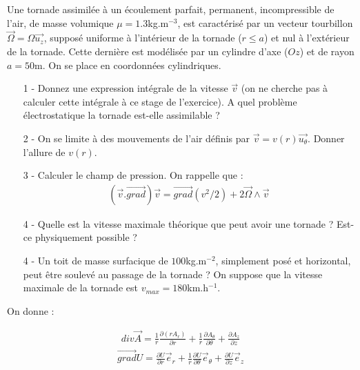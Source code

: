 \documentclass{report}
\begin{document}
Une tornade assimilée à un écoulement parfait, permanent, incompressible de l'air, de masse volumique $\mu = 1.3$kg.m$^{-3}$, est caractérisé par un vecteur tourbillon $\vec{\Omega} = \Omega \vec{u_{z}}$, supposé uniforme à l'intérieur de la tornade ($r\leq a$) et nul à l'extérieur de la tornade. Cette dernière est modélisée par un cylindre d'axe ($Oz$) et de rayon $a=50$m. On se place en coordonnées cylindriques.

\begin{itemize}

	\item[1 - ] Donnez une expression intégrale de la vitesse $\vec{v}$ (on ne cherche pas à calculer cette intégrale à ce stage de l'exercice). A quel problème électrostatique la tornade est-elle assimilable ?
	\item[2 - ] On se limite à des mouvements de l'air définis par $\vec{v} = v(r)\vec{u_{\theta}}$. Donner l'allure de $v(r)$.
	\item[3 - ] Calculer le champ de pression. On rappelle que : 
	\begin{align*}
		(\vec{v}.\vec{grad})\vec{v} =\vec{grad}(v^{2}/2) + 2\vec{\Omega}\wedge \vec{v}
	\end{align*}
	\item[4 - ] Quelle est la vitesse maximale théorique que peut avoir une tornade ? Est-ce physiquement possible ?
	\item[4 - ] Un toit de masse surfacique de $100$kg.m$^{-2}$, simplement posé et horizontal, peut être soulevé au passage de la tornade ? On suppose que la vitesse maximale de la tornade est $v_{max} = 180$km.h$^{-1}$.
\end{itemize}

On donne :

\begin{align*}
	div\vec{A} = \frac{1}{r}\frac{\partial(rA_{r})}{\partial r} +\frac{1}{r}\frac{\partial A_{\theta}}{\partial\theta} + \frac{\partial A_{z}}{\partial z}
\end{align*}
\begin{align*}
	\vec{grad}U = \frac{\partial U}{\partial r}\vec{e}_{r} +\frac{1}{r}\frac{\partial U}{\partial\theta}\vec{e}_{\theta} + \frac{\partial U}{\partial z}\vec{e}_{z}
\end{align*}
\end{document}
